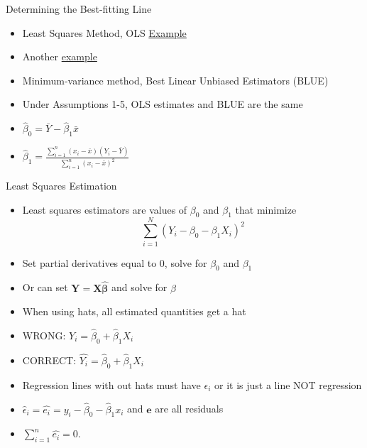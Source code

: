 \documentclass[handout,x11names,unknownkeysallowed]{beamer}
\makeatletter
\newcommand{\beamitem}{\begin{itemize}[<+-|alert@+>]}
\makeatother
\begin{document}
\begin{frame}
Determining the Best-fitting Line

\beamitem
\item Least Squares Method, OLS \href{http://www.rossmanchance.com/applets/Reg/index.html}{Example}
\item Another \href{http://hspm.sph.sc.edu/COURSES/J716/demos/LeastSquares/LeastSquaresDemo.html}{example}
\item Minimum-variance method, Best Linear Unbiased Estimators (BLUE) 
\item Under Assumptions 1-5, OLS estimates and BLUE are the same
\item $\hat\beta_0 = \bar{Y} - \hat\beta_1\bar{x}$
\item $\hat\beta_1 = \frac{\sum_{i=1}^n (x_i-\bar{x})(Y_i - \bar{Y})}{\sum_{i=1}^n (x_i-\bar{x})^2}$
\end{itemize}

\end{frame}
\begin{frame}
{ \begin{center} 
Least Squares Estimation
\end{center}}
\begin{itemize}
\vspace{.1in}

\item Least squares estimators are values of $\beta_0$ and $\beta_1$ that
minimize
\[
 \sum_{i=1}^N (Y_i - \beta_0 - \beta_1 X_i)^2
\]

\item Set partial derivatives equal to 0, solve for $\beta_0$ and $\beta_1$

\item Or can set $\bm{Y} = \bm{X\hat\beta}$ and solve for $\hat\beta$

\end{itemize}
\end{frame}


\begin{frame}
\beamitem
\item When using hats, all estimated quantities get a hat
\item WRONG: $Y_i = \hat\beta_0 + \hat\beta_1X_i$
\item CORRECT: $\hat{Y_i} = \hat\beta_0 + \hat\beta_1X_i$
\item Regression lines with out hats must have $\epsilon_i$ or it is just a line NOT regression
\item $\hat\epsilon_i = \hat{e_i} = y_i - \hat\beta_0 - \hat\beta_1x_i$ and $\bm{\hat{e}}$ are all residuals
\item $\sum_{i=1}^n \hat{e_i} =0$.
\end{itemize}
\end{frame}
\end{document}
